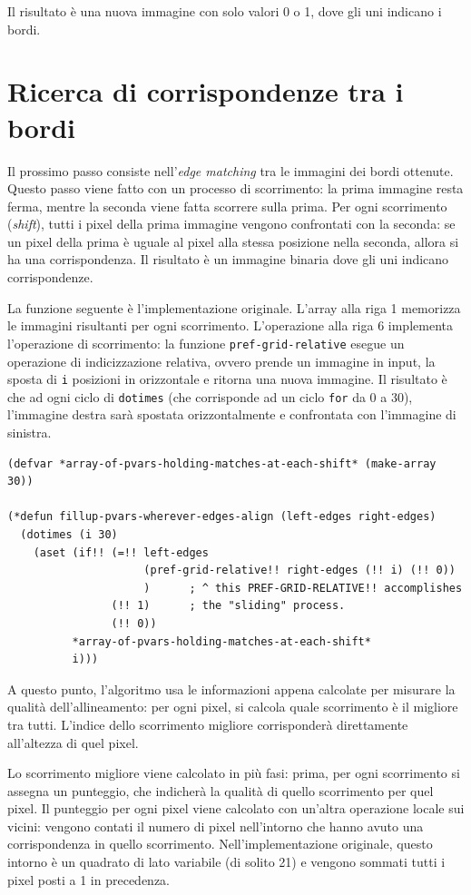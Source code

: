 \documentclass[12pt,a4paper,openright,twoside]{report}
\begin{document}
Il risultato è una nuova immagine con solo valori 0 o 1, dove gli uni indicano i bordi.

\section{Ricerca di corrispondenze tra i bordi}

Il prossimo passo consiste nell'\textit{edge matching} tra le immagini dei bordi ottenute. Questo passo viene fatto con un processo di scorrimento: la prima immagine resta ferma, mentre la seconda viene fatta scorrere sulla prima. Per ogni scorrimento (\textit{shift}), tutti i pixel della prima immagine vengono confrontati con la seconda: se un pixel della prima è uguale al pixel alla stessa posizione nella seconda, allora si ha una corrispondenza. Il risultato è un immagine binaria dove gli uni indicano corrispondenze.

La funzione seguente è l'implementazione originale. L'array alla riga 1 memorizza le immagini risultanti per ogni scorrimento. L'operazione alla riga 6 implementa l'operazione di scorrimento: la funzione \verb|pref-grid-relative| esegue un operazione di indicizzazione relativa, ovvero prende un immagine in input, la sposta di \verb|i| posizioni in orizzontale e ritorna una nuova immagine. Il risultato è che ad ogni ciclo di \verb|dotimes| (che corrisponde ad un ciclo \verb|for| da 0 a 30), l'immagine destra sarà spostata orizzontalmente e confrontata con l'immagine di sinistra.

\begin{lstlisting}[style=mystyle]
(defvar *array-of-pvars-holding-matches-at-each-shift* (make-array 30))

(*defun fillup-pvars-wherever-edges-align (left-edges right-edges)
  (dotimes (i 30)
    (aset (if!! (=!! left-edges
                     (pref-grid-relative!! right-edges (!! i) (!! 0))
                     )      ; ^ this PREF-GRID-RELATIVE!! accomplishes
                (!! 1)      ; the "sliding" process.
                (!! 0))
          *array-of-pvars-holding-matches-at-each-shift*
          i)))
\end{lstlisting}

A questo punto, l'algoritmo usa le informazioni appena calcolate per misurare la qualità dell'allineamento: per ogni pixel, si calcola quale scorrimento è il migliore tra tutti. L'indice dello scorrimento migliore corrisponderà direttamente all'altezza di quel pixel.

Lo scorrimento migliore viene calcolato in più fasi: prima, per ogni scorrimento si assegna un punteggio, che indicherà la qualità di quello scorrimento per quel pixel. Il punteggio per ogni pixel viene calcolato con un'altra operazione locale sui vicini: vengono contati il numero di pixel nell'intorno che hanno avuto una corrispondenza in quello scorrimento. Nell'implementazione originale, questo intorno è un quadrato di lato variabile (di solito 21) e vengono sommati tutti i pixel posti a 1 in precedenza.
\end{document}
